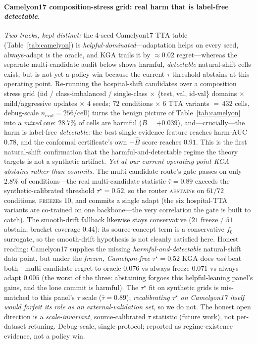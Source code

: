 \documentclass[conference]{IEEEtran}
\theoremstyle{plain}
\theoremstyle{definition}
\begin{document}
\paragraph{Camelyon17 composition-stress grid: real harm that is label-free \emph{detectable}.}
\emph{Two tracks, kept distinct:} the 4-seed Camelyon17 TTA table
(Table~\ref{tab:camelyon}) is \emph{helpful-dominated}---adaptation helps on every
seed, always-adapt is the oracle, and \textsc{KGA} trails it by ${\approx}0.02$
regret---whereas the separate multi-candidate audit below shows harmful,
\emph{detectable} natural-shift cells exist, but is not yet a policy win because the
current $\tau$ threshold abstains at this operating point.
Re-running the hospital-shift candidates over a composition stress grid (iid / class-imbalanced /
single-class $\times$ \{test, val, id-val\} domains $\times$ mild/aggressive updates $\times$ $4$
seeds; $72$ conditions $\times$ $6$ TTA variants ${=}\,432$ cells, debug-scale
$n_{\mathrm{eval}}{=}256$/cell) turns the benign picture of Table~\ref{tab:camelyon} into a
\emph{mixed} one: $28.7\%$ of cells are harmful ($\bar B{=}{+}0.039$), and---crucially---the harm is
label-free \emph{detectable}: the best single evidence feature reaches harm-AUC $0.78$, and the
conformal certificate's own $-\widehat B$ score reaches $0.91$. This is the first natural-shift
confirmation that the harmful-and-detectable regime the theory targets is not a synthetic artifact.
\emph{Yet at our current operating point \textsc{KGA} abstains rather than commits.} The
multi-candidate route's gate passes on only $2.8\%$ of conditions---the real multi-candidate
statistic $\bar\tau{=}0.89$ exceeds the synthetic-calibrated threshold $\tau^\star{=}0.52$, so the
router \textsc{abstain}s on $61/72$ conditions, \textsc{freeze}s $10$, and commits a single adapt
(the six hospital-TTA variants are co-trained on one backbone---the very correlation the gate is
built to catch). The smooth-drift fallback likewise stays conservative ($21$ freeze / $51$ abstain,
bracket coverage $0.44$): its source-concept term is a conservative $f_0$ surrogate, so the
smooth-drift hypothesis is not cleanly satisfied here. Honest reading: Camelyon17 supplies the
missing \emph{harmful-and-detectable} natural-shift data point, but under the \emph{frozen,
Camelyon-free} $\tau^\star{=}0.52$ \textsc{KGA} does \emph{not} beat both---multi-candidate
regret-to-oracle $0.076$ vs always-freeze $0.071$ vs always-adapt $0.005$ (the worst of the three:
abstaining forgoes this helpful-leaning panel's gains, and the lone commit is harmful). The
$\tau^\star$ fit on synthetic grids is mis-matched to this panel's $\tau$ scale ($\bar\tau{=}0.89$);
\emph{recalibrating $\tau^\star$ on Camelyon17 itself would forfeit its role as an
external-validation set}, so we do not. The honest open direction is a \emph{scale-invariant},
source-calibrated $\tau$ statistic (future work), not per-dataset retuning. Debug-scale, single
protocol; reported as regime-existence evidence, not a policy win.
\end{document}
